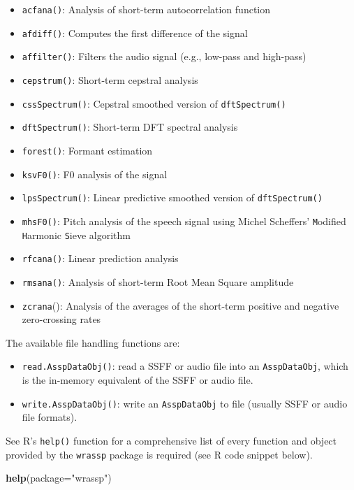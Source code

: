 \documentclass[]{book}
\newenvironment{Shaded}{\begin{snugshade}}{\end{snugshade}}
\newcommand{\DataTypeTok}[1]{\textcolor[rgb]{0.13,0.29,0.53}{#1}}
\newcommand{\KeywordTok}[1]{\textcolor[rgb]{0.13,0.29,0.53}{\textbf{#1}}}
\newcommand{\NormalTok}[1]{#1}
\newcommand{\StringTok}[1]{\textcolor[rgb]{0.31,0.60,0.02}{#1}}
\providecommand{\tightlist}{%
  \setlength{\itemsep}{0pt}\setlength{\parskip}{0pt}}
\begin{document}
\begin{itemize}
\tightlist
\item
  \texttt{acfana()}: Analysis of short-term autocorrelation function
\item
  \texttt{afdiff()}: Computes the first difference of the signal
\item
  \texttt{affilter()}: Filters the audio signal (e.g., low-pass and high-pass)
\item
  \texttt{cepstrum()}: Short-term cepstral analysis
\item
  \texttt{cssSpectrum()}: Cepstral smoothed version of \texttt{dftSpectrum()}
\item
  \texttt{dftSpectrum()}: Short-term DFT spectral analysis
\item
  \texttt{forest()}: Formant estimation
\item
  \texttt{ksvF0()}: F0 analysis of the signal
\item
  \texttt{lpsSpectrum()}: Linear predictive smoothed version of \texttt{dftSpectrum()}
\item
  \texttt{mhsF0()}: Pitch analysis of the speech signal using Michel Scheffers' \texttt{M}odified \texttt{H}armonic \texttt{S}ieve algorithm
\item
  \texttt{rfcana()}: Linear prediction analysis
\item
  \texttt{rmsana()}: Analysis of short-term Root Mean Square amplitude
\item
  \texttt{zcrana}(): Analysis of the averages of the short-term positive and negative zero-crossing rates
\end{itemize}

The available file handling functions are:

\begin{itemize}
\tightlist
\item
  \texttt{read.AsspDataObj()}: read a SSFF or audio file into an \texttt{AsspDataObj}, which is the in-memory equivalent of the SSFF or audio file.
\item
  \texttt{write.AsspDataObj()}: write an \texttt{AsspDataObj} to file (usually SSFF or audio file formats).
\end{itemize}

See R's \texttt{help()} function for a comprehensive list of every function and object provided by the \texttt{wrassp} package is required (see R code snippet below).

\begin{Shaded}
\begin{Highlighting}[]
\KeywordTok{help}\NormalTok{(}\DataTypeTok{package=}\StringTok{"wrassp"}\NormalTok{)}
\end{Highlighting}
\end{Shaded}
\end{document}
